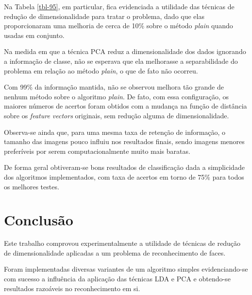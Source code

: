 \documentclass[10pt,twocolumn,letterpaper]{article}
\begin{document}
Na Tabela \ref{tbl-95}, em particular, fica evidenciada a utilidade das técnicas de redução de dimensionalidade para tratar o problema, dado que elas proporcionaram uma melhoria de cerca de 10\% sobre o método \emph{plain} quando usadas em conjunto.

Na medida em que a técnica PCA reduz a dimensionalidade dos dados ignorando a informação de classe, não se esperava que ela melhorasse a separabilidade do problema em relação ao método \emph{plain}, o que de fato não ocorreu.

Com 99\% da informação mantida, não se observou melhora tão grande de nenhum método sobre o algoritmo \emph{plain}. De fato, com essa configuração, os maiores números de acertos foram obtidos com a mudança na função de distância sobre os \emph{feature vectors} originais, sem redução alguma de dimensionalidade.

Observa-se ainda que, para uma mesma taxa de retenção de informação, o tamanho das imagens pouco influiu nos resultados finais, sendo imagens menores preferíveis por serem computacionalmente muito mais baratas.

De forma geral obtiveram-se bons resultados de classificação dada a simplicidade dos algoritmos implementados, com taxa de acertos em torno de 75\%  para todos os melhores testes.

\section{Conclusão}

Este trabalho comprovou experimentalmente a utilidade de técnicas de redução de dimensionalidade aplicadas a um problema de reconhecimento de faces.

Foram implementadas diversas variantes de um algoritmo simples evidenciando-se com sucesso a influência da aplicação das técnicas LDA e PCA e obtendo-se resultados razoáveis no reconhecimento em si.

{\small


}
\end{document}
